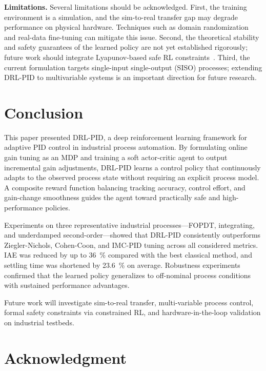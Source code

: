 \documentclass[conference,a4paper]{IEEEtran}[2015/08/26]
\begin{document}
\textbf{Limitations.}
Several limitations should be acknowledged. First, the training
environment is a simulation, and the sim-to-real transfer gap may
degrade performance on physical hardware. Techniques such as domain
randomization~\cite{Hwangbo2019} and real-data fine-tuning can
mitigate this issue. Second, the theoretical stability and safety
guarantees of the learned policy are not yet established rigorously;
future work should integrate Lyapunov-based safe RL
constraints~\cite{Lawrence2022}. Third, the current formulation
targets single-input single-output (SISO) processes; extending DRL-PID
to multivariable systems is an important direction for future research.

\section{Conclusion}
\label{sec:conclusion}

This paper presented DRL-PID, a deep reinforcement learning framework
for adaptive PID control in industrial process automation. By formulating
online gain tuning as an MDP and training a soft actor-critic agent to
output incremental gain adjustments, DRL-PID learns a control policy
that continuously adapts to the observed process state without requiring
an explicit process model. A composite reward function balancing tracking
accuracy, control effort, and gain-change smoothness guides the agent
toward practically safe and high-performance policies.

Experiments on three representative industrial processes---FOPDT,
integrating, and underdamped second-order---showed that DRL-PID
consistently outperforms Ziegler-Nichols, Cohen-Coon, and IMC-PID tuning
across all considered metrics. IAE was reduced by up to \SI{36}{\percent}
compared with the best classical method, and settling time was shortened
by \SI{23.6}{\percent} on average. Robustness experiments confirmed
that the learned policy generalizes to off-nominal process conditions
with sustained performance advantages.

Future work will investigate sim-to-real transfer, multi-variable process
control, formal safety constraints via constrained RL, and hardware-in-the-loop
validation on industrial testbeds.

\section*{Acknowledgment}
\end{document}
